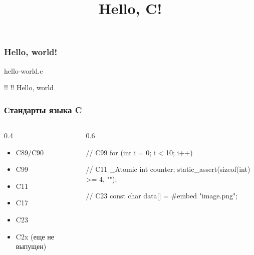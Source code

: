 \documentclass[compress, 8pt, aspectratio=169]{beamer}
\title{Hello, C!}
\begin{document}
\frame[plain]{\titlepage}

\begin{frame}[fragile]

    \frametitle{Hello, world!}

        {hello-world.c}

    \begin{terminalwindow}
!!
!!
Hello, world
    \end{terminalwindow}

\end{frame}

\begin{frame}[fragile]

    \frametitle{Стандарты языка C}

    \begin{columns}

        \begin{column}{0.4\textwidth}

            \begin{itemize}

                \item C89/C90
                \item C99
                \item C11
                \item C17
                \item C23
                \item C2x (еще не выпущен)

            \end{itemize}

        \end{column}

        \begin{column}{0.6\textwidth}

            \begin{myinplacelisting}[minted language=c]
// C99
for (int i = 0; i < 10; i++) {
}

// C11
_Atomic int counter;
static_assert(sizeof(int) >= 4, "");

// C23
const char data[] = #embed "image.png";
            \end{myinplacelisting}
        \end{column}

    \end{columns}

\end{frame}
\end{document}
